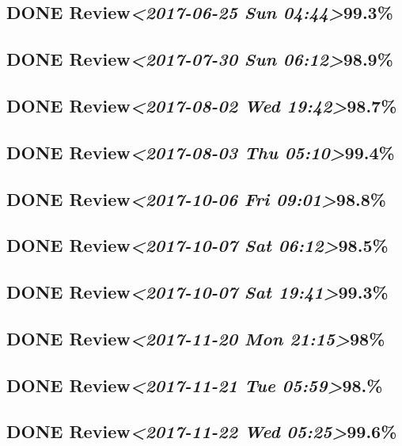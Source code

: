\documentclass[11pt]{ctexart}
\begin{document}
\subsection{{\bfseries\sffamily DONE} Review\textit{<2017-06-25 Sun 04:44>}99.3\%}
\label{sec:org6bea2e8}
\subsection{{\bfseries\sffamily DONE} Review\textit{<2017-07-30 Sun 06:12>}98.9\%}
\label{sec:org30a9165}
\subsection{{\bfseries\sffamily DONE} Review\textit{<2017-08-02 Wed 19:42>}98.7\%}
\label{sec:orgf0d721d}
\subsection{{\bfseries\sffamily DONE} Review\textit{<2017-08-03 Thu 05:10>}99.4\%}
\label{sec:org859dcb1}
\subsection{{\bfseries\sffamily DONE} Review\textit{<2017-10-06 Fri 09:01>}98.8\%}
\label{sec:org6c6feb5}
\subsection{{\bfseries\sffamily DONE} Review\textit{<2017-10-07 Sat 06:12>}98.5\%}
\label{sec:org983b006}
\subsection{{\bfseries\sffamily DONE} Review\textit{<2017-10-07 Sat 19:41>}99.3\%}
\label{sec:org761ec28}

\subsection{{\bfseries\sffamily DONE} Review\textit{<2017-11-20 Mon 21:15>}98\%}
\label{sec:org2f4d3a2}
\subsection{{\bfseries\sffamily DONE} Review\textit{<2017-11-21 Tue 05:59>}98.\%}
\label{sec:org2b1e984}
\subsection{{\bfseries\sffamily DONE} Review\textit{<2017-11-22 Wed 05:25>}99.6\%}
\label{sec:org1572346}
\end{document}
